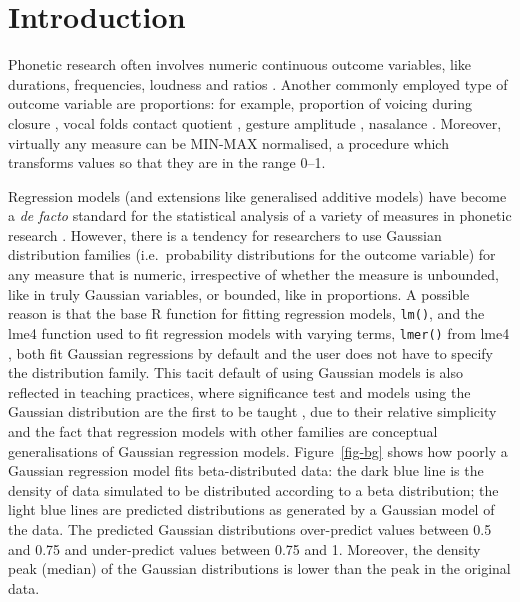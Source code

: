 \documentclass[
  authoryear,
  preprint,
  3p]{elsarticle}
\begin{document}
\section{Introduction}\label{introduction}

Phonetic research often involves numeric continuous outcome variables,
like durations, frequencies, loudness and ratios
\citep{kluender1988, johnson2003, gick2013, ladefoged2014, abramson2017, roettger2018, coretta2023, rosen2005}.
Another commonly employed type of outcome variable are proportions: for
example, proportion of voicing during closure \citep{davidson2016},
vocal folds contact quotient \citep{herbst2017}, gesture amplitude
\citep{carignan2021}, nasalance \citep{carignan2021}. Moreover,
virtually any measure can be MIN-MAX normalised, a procedure which
transforms values so that they are in the range 0--1.

Regression models (and extensions like generalised additive models) have
become a \emph{de facto} standard for the statistical analysis of a
variety of measures in phonetic research
\citep{kirby2018, politzerahles2018, tavakoli2024}. However, there is a
tendency for researchers to use Gaussian distribution families
(i.e.~probability distributions for the outcome variable) for any
measure that is numeric, irrespective of whether the measure is
unbounded, like in truly Gaussian variables, or bounded, like in
proportions. A possible reason is that the base R function for fitting
regression models, \texttt{lm()}, and the lme4 function used to fit
regression models with varying terms, \texttt{lmer()} from lme4
\citep{bates2015}, both fit Gaussian regressions by default and the user
does not have to specify the distribution family. This tacit default of
using Gaussian models is also reflected in teaching practices, where
significance test and models using the Gaussian distribution are the
first to be taught \citep{baayen2008, winter2020}, due to their relative
simplicity and the fact that regression models with other families are
conceptual generalisations of Gaussian regression models.
Figure~\ref{fig-bg} shows how poorly a Gaussian regression model fits
beta-distributed data: the dark blue line is the density of data
simulated to be distributed according to a beta distribution; the light
blue lines are predicted distributions as generated by a Gaussian model
of the data. The predicted Gaussian distributions over-predict values
between 0.5 and 0.75 and under-predict values between 0.75 and 1.
Moreover, the density peak (median) of the Gaussian distributions is
lower than the peak in the original data.
\end{document}
